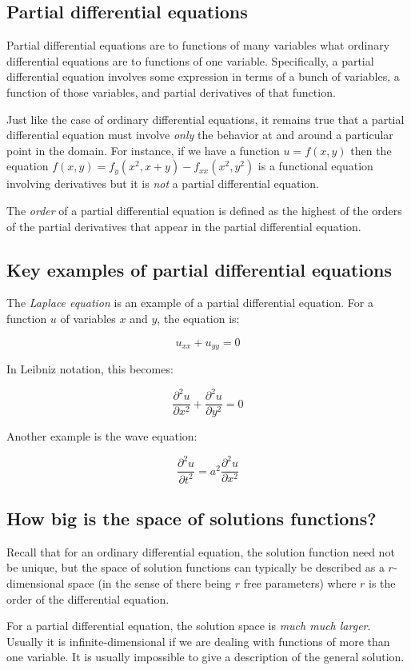 \documentclass[10pt]{amsart}
\begin{document}
\subsection{Partial differential equations}

Partial differential equations are to functions of many variables what
ordinary differential equations are to functions of one
variable. Specifically, a partial differential equation involves some
expression in terms of a bunch of variables, a function of those
variables, and partial derivatives of that function.

Just like the case of ordinary differential equations, it remains true
that a partial differential equation must involve {\em only} the
behavior at and around a particular point in the domain. For instance,
if we have a function $u = f(x,y)$ then the equation $f(x,y) =
f_y(x^2,x + y) - f_{xx}(x^2,y^2)$ is a functional equation involving
derivatives but it is {\em not} a partial differential equation.

The {\em order} of a partial differential equation is defined as the
highest of the orders of the partial derivatives that appear in the
partial differential equation.

\subsection{Key examples of partial differential equations}

The {\em Laplace equation} is an example of a partial differential
equation. For a function $u$ of variables $x$ and $y$, the equation is:

$$u_{xx} + u_{yy} = 0$$

In Leibniz notation, this becomes:

$$\frac{\partial^2 u}{\partial x^2} + \frac{\partial^2 u}{\partial y^2} = 0$$

Another example is the wave equation:

$$\frac{\partial^2u}{\partial t^2} = a^2\frac{\partial^2u}{\partial x^2}$$

\subsection{How big is the space of solutions functions?}

Recall that for an ordinary differential equation, the solution
function need not be unique, but the space of solution functions can
typically be described as a $r$-dimensional space (in the sense of
there being $r$ free parameters) where $r$ is the order of the
differential equation.

For a partial differential equation, the solution space is {\em much
much larger}. Usually it is infinite-dimensional if we are dealing
with functions of more than one variable. It is usually impossible to
give a description of the general solution.
\end{document}
